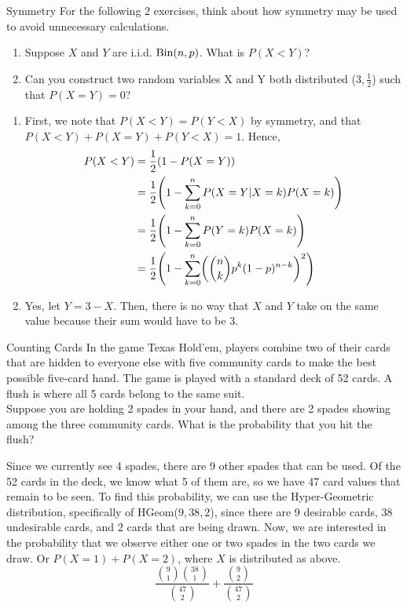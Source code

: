 \documentclass[11pt]{article}
\begin{document}
\begin{exercise}{Symmetry} For the following 2 exercises, think about how symmetry may be used to avoid unnecessary calculations. 
\begin{enumerate}[label=(\alph*)]
        \item Suppose $X$ and $Y$ are i.i.d. $\textrm{Bin}(n, p)$. What is $P(X < Y)$?
        \item Can you construct two random variables X and Y both distributed \Bin($3, \frac{1}{2}$) such that $P(X=Y)=0$?
\end{enumerate}
\end{exercise}
\begin{solution}{3}
\vspace{-5mm}
\begin{enumerate}[label=(\alph*)]
\item
First, we note that $P(X < Y) = P(Y < X)$ by symmetry, and that $P(X < Y) + P(X = Y) + P(Y < X) = 1$. Hence,
\begin{align*}
P(X < Y) &= \frac{1}{2}\paren{1 - P(X = Y)} \\
&= \frac{1}{2}\paren{1 - \sum_{k=0}^n P(X = Y | X = k)P(X = k)} \\
&= \frac{1}{2}\paren{1 - \sum_{k=0}^n P(Y = k)P(X = k)} \\
&= \frac{1}{2}\paren{1 - \sum_{k=0}^n\paren{\binom{n}{k}p^k(1 - p)^{n - k}}^2}
\end{align*}
\item
Yes, let $Y = 3 - X$. Then, there is no way that $X$ and $Y$ take on the same value because their sum would have to be 3. 
\end{enumerate}
\end{solution}

\begin{exercise}{Counting Cards}
In the game Texas Hold'em, players combine two of their cards that are hidden to everyone else with five community cards to make the best possible five-card hand. The game is played with a standard deck of 52 cards. A flush is where all 5 cards belong to the same suit. \\

Suppose you are holding 2 spades in your hand, and there are 2 spades showing among the three community cards. What is the probability that you hit the flush? 
\end{exercise}

\begin{solution}{2}
Since we currently see 4 spades, there are 9 other spades that can be used. Of the 52 cards in the deck, we know what 5 of them are, so we have 47 card values that remain to be seen. To find this probability, we can use the Hyper-Geometric distribution, specifically of HGeom($9, 38, 2$), since there are 9 desirable cards, 38 undesirable cards, and 2 cards that are being drawn. Now, we are interested in the probability that we observe either one or two spades in the two cards we draw. Or $P(X = 1) + P(X=2)$, where $X$ is distributed as above. 
    $$\frac{{9 \choose 1}{38 \choose 1}}{{47 \choose 2}} + \frac{{9 \choose 2}}{{47 \choose 2}}$$
\end{solution}
\end{document}
